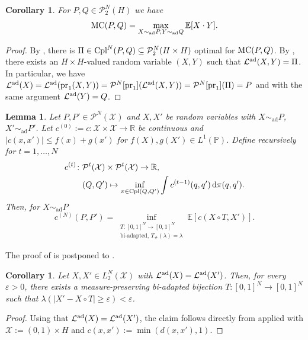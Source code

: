 \documentclass[a4paper]{amsart}
\numberwithin{theorem}{section}
\newtheorem{lemma}[theorem]{Lemma}
\newtheorem{corollary}[theorem]{Corollary}
\theoremstyle{definition}
\newcommand{\R}{\mathbb{R}}
\newcommand{\E}{\mathbb{E}}
\newcommand{\pr}{\textup{pr}}
\newcommand{\law}{\mathcal{L}}
\newcommand{\cpl}{\textup{Cpl}}
\newcommand{\Pc}{\mathcal P}
\renewcommand{\epsilon}{\varepsilon}
\renewcommand{\subset}{\subseteq}
\newcommand{\simad}{\sim_{\mathrm{ad}}}
\renewcommand{\H}{H}
\newcommand{\mc}{\textup{MC}}
\newcommand{\lawad}{\law^{\textup{ad}}}
\begin{document}
\begin{corollary}\label{cor:MC_max_over_RV}
For $P, Q \in \Pc_2^N(\H)$ we have 
    \[
    \mc(P,Q) = \max_{ X \simad P, Y \simad Q} \E[ X \cdot Y].
    \]  
\end{corollary}
\begin{proof}
By , there is $\Pi \in \cpl^N(P,Q) \subset \Pc_2^N(\H \times \H)$  optimal for $\mc(P,Q)$. By , there exists an $\H\times\H$-valued random variable $(X,Y)$ such that $\lawad(X,Y)=\Pi$. In particular, we have $\lawad(X) = \lawad( \pr_1(X,Y)) = \Pc^N[\pr_1](\lawad(X,Y)) = \Pc^N[\pr_1](\Pi) =P  $ and with the same argument $\lawad(Y)=Q$.
\end{proof}






\begin{lemma} \label{lem:DPP}
    Let $P,P' \in \mathcal P^N(\mathcal X)$ and $X,X'$ be random variables with $X\simad P$, $X' \simad P'$.
    Let $c^{(0)} := c : \mathcal X \times \mathcal X \to \R$ be continuous and $|c(x,x')| \le f(x) + g(x')$ for $f(X),g(X') \in L^1(\mathbb P)$.
    Define recursively for $t = 1,\dots,N$
    \[
    \begin{aligned}
    c^{(t)} \colon &\Pc^{t}(\mathcal{X}) \times \Pc^{t}(\mathcal{X}) \to \R,\\
    &(Q,Q') \mapsto \inf_{\pi \in \cpl(Q,Q')} \int c^{(t-1)}(q,q')\, \mathrm{d}\pi(q,q').
    \end{aligned}
    \]    
    Then, for $X \simad P$ 
    \[
        c^{(N)}(P,P') =
        \inf_{ 
        \substack{ T : [0,1]^N \to [0,1]^N \\  \text{bi-adapted, } T_{\#}(\lambda)=\lambda }}  
        \E[c(X \circ T,X')].
    \]
\end{lemma}
The proof of  is postponed to . 



\begin{corollary}\label{cor:transfer_ad}   
    Let $X,X' \in L_2^N(\mathcal X)$ with $\lawad(X) = \lawad(X')$.
    Then, for every $\epsilon > 0$, there exists a measure-preserving bi-adapted bijection $T : [0,1]^N \to [0,1]^N$ such that $\lambda(|X' - X \circ T| \ge \epsilon) < \epsilon$.
\end{corollary}


\begin{proof}
    Using that $\lawad(X) = \lawad(X')$, the claim follows directly from  applied with $\mathcal X := (0,1) \times \H$ and $c(x,x'):= \min(d(x,x'),1)$. 
\end{proof}
\end{document}
